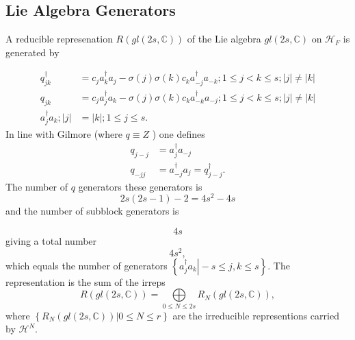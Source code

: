 \documentclass[aps,preprint]{revtex4}%
\begin{document}
\subsection{Lie Algebra Generators}

A reducible represenation $R\left(  gl\left(  2s,\mathbb{C}\right)  \right)  $
of the Lie algebra $gl\left(  2s,\mathbb{C}\right)  $ on $\mathcal{H}_{F}$ is
generated by%

\begin{align}
q_{jk}^{\dagger}  &  =c_{j}a_{k}^{\dagger}a_{j}-\sigma\left(  j\right)
\sigma\left(  k\right)  c_{k}a_{-j}^{\dagger}a_{-k};1\leq j<k\leq s;\left\vert
j\right\vert \neq\left\vert k\right\vert \nonumber\\
q_{jk}  &  =c_{j}a_{j}^{\dagger}a_{k}-\sigma\left(  j\right)  \sigma\left(
k\right)  c_{k}a_{-k}^{\dagger}a_{-j};1\leq j<k\leq s;\left\vert j\right\vert
\neq\left\vert k\right\vert \nonumber\\
a_{j}^{\dagger}a_{k};\left\vert j\right\vert  &  =\left\vert k\right\vert
;1\leq j\leq s.
\end{align}
In line with Gilmore (where $q\equiv Z$ ) one defines
\begin{align}
q_{j-j}  &  =a_{j}^{\dagger}a_{-j}\nonumber\\
q_{-jj}  &  =a_{-j}^{\dagger}a_{j}=q_{j-j}^{\dagger}.
\end{align}
The number of $q$ generators these generators is
\begin{equation}
2s(2s-1)-2=4s^{2}-4s
\end{equation}
and the number of subblock generators is%

\begin{equation}
4s
\end{equation}
giving a total number
\begin{equation}
4s^{2},
\end{equation}
which equals the number of generators $\left\{  \left.  a_{j}^{\dagger}%
a_{k}\right\vert -s\leq j,k\leq s\right\}  .$ The representation is the sum of
the irreps
\begin{equation}
R\left(  gl\left(  2s,\mathbb{C}\right)  \right)  =\bigoplus\limits_{0\leq
N\leq2s}R_{N}\left(  gl\left(  2s,\mathbb{C}\right)  \right)  ,
\end{equation}
where $\left\{  \left.  R_{N}\left(  gl\left(  2s,\mathbb{C}\right)  \right)
\right\vert 0\leq N\leq r\right\}  $ are the irreducible representions carried
by $\mathcal{H}^{N}.$
\end{document}
